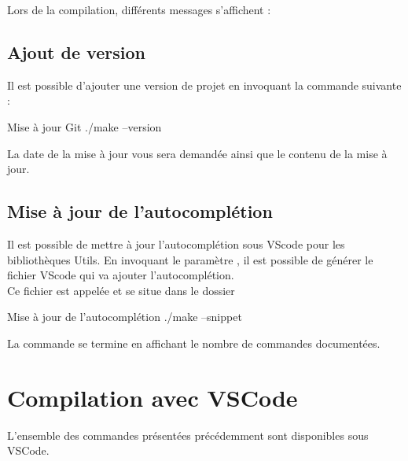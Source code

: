 Lors de la compilation, différents messages s'affichent : 


\subsection{Ajout de version}\label{addVersion}

Il est possible d'ajouter une version de projet en invoquant la commande suivante : 

\begin{Bash}{Mise à jour Git}
./make --version
\end{Bash}

La date de la mise à jour vous sera demandée ainsi que le contenu de la mise à jour.



\label{setLayout}
\subsection{Mise à jour de l'autocomplétion}

Il est possible de mettre à jour l'autocomplétion sous VScode pour les bibliothèques Utils.
En invoquant le paramètre , il est possible de générer le fichier VScode qui va ajouter l'autocomplétion.\\
Ce fichier est appelée  et se situe dans le dossier 

\begin{Bash}{Mise à jour de l'autocomplétion}
./make --snippet
\end{Bash}

La commande se termine en affichant le nombre de commandes documentées.







\section{Compilation avec VSCode}

L'ensemble des commandes présentées précédemment sont disponibles sous VSCode.\\

